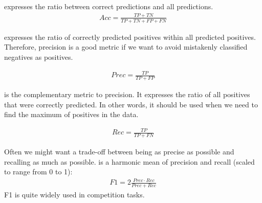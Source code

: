  expresses the ratio between correct predictions and all predictions.
\begin{align}
Acc = \frac{TP+TN}{TP+TN+FP+FN}
\end{align} 



 expresses the ratio of correctly predicted positives within all predicted positives. Therefore, precision is a good metric if we want to avoid mistakenly classified negatives as positives.

\begin{align} 
Prec = \frac{TP}{TP + FP}
\end{align}

 is the complementary metric to precision. It expresses the ratio of all positives that were correctly predicted. In other words, it should be used when we need to find the maximum of positives in the data.

\begin{align}
Rec = \frac{TP}{TP + FN}
\end{align}

Often we might want a trade-off between being as precise as possible and recalling as much as possible.  is a harmonic mean of precision and recall (scaled to range from 0 to 1): \begin{align}
F1 = 2\frac{Prec \cdot Rec}{Prec + Rec}
\end{align}
F1 is quite widely used in competition tasks.






